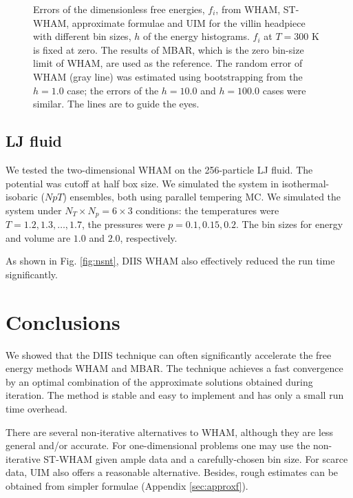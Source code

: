 \documentclass[reprint,aip,jcp,superscriptaddress]{revtex4-1}
\begin{document}
\begin{figure}[h]
  \caption{
    \label{fig:whamcmp}
    Errors of
    the dimensionless free energies, $f_i$,
    from WHAM, ST-WHAM, approximate formulae and UIM
    for the villin headpiece
    with different bin sizes, $h$
    of the energy histograms.
    $f_i$ at $T = 300$ K is fixed at zero.
    The results of MBAR, which is
    the zero bin-size limit of WHAM,
    are used as the reference.
    The random error of WHAM (gray line)
    was estimated using bootstrapping
    from the $h = 1.0$ case;
    the errors of the $h = 10.0$
    and $h = 100.0$ cases were similar.
    The lines are to guide the eyes.
  }
\end{figure}




\subsection{\label{sec:results_LJ}
LJ fluid}


We tested the two-dimensional WHAM
on the 256-particle LJ fluid.
%
The potential was cutoff at half box size.
%
We simulated the system in isothermal-isobaric ($NpT$) ensembles,
both using parallel tempering MC.
%
We simulated the system
under $N_T \times N_p = 6\times 3$ conditions:
the temperatures were $T = 1.2, 1.3, \dots, 1.7$,
the pressures were $p = 0.1, 0.15, 0.2$.
%
The bin sizes for energy and volume
are $1.0$ and $2.0$, respectively.


As shown in Fig. \ref{fig:nsnt},
DIIS WHAM also effectively
reduced the run time significantly.





\section{Conclusions}



We showed that the DIIS technique
can often significantly accelerate
the free energy methods WHAM and MBAR.
%
The technique achieves a fast convergence
by an optimal combination of the approximate
solutions obtained during iteration.
%
The method is stable and easy to implement
and has only a small run time overhead.



There are several
non-iterative alternatives to WHAM,
although they are less general and/or accurate.
%
For one-dimensional problems
one may use
the non-iterative ST-WHAM
given ample data
and a carefully-chosen bin size.
%
For scarce data,
UIM also offers a reasonable alternative.
%
Besides,
rough estimates
can be obtained from simpler formulae
(Appendix \ref{sec:approxf}).
\end{document}
